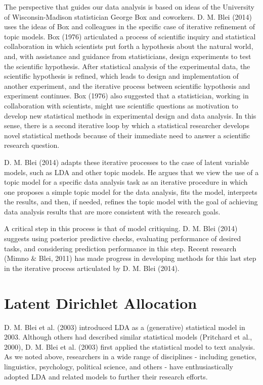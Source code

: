 \documentclass[12pt,]{article}
\begin{document}
The perspective that guides our data analysis is based on ideas of the
University of Wisconsin-Madison statistician George Box and coworkers.
D. M. Blei (2014) uses the ideas of Box and colleagues in the specific
case of iterative refinement of topic models. Box (1976) articulated a
process of scientific inquiry and statistical collaboration in which
scientists put forth a hypothesis about the natural world, and, with
assistance and guidance from statisticians, design experiments to test
the scientific hypothesis. After statistical analysis of the
experimental data, the scientific hypothesis is refined, which leads to
design and implementation of another experiment, and the iterative
process between scientific hypothesis and experiment continues. Box
(1976) also suggested that a statistician, working in collaboration with
scientists, might use scientific questions as motivation to develop new
statistical methods in experimental design and data analysis. In this
sense, there is a second iterative loop by which a statistical
researcher develops novel statistical methods because of their immediate
need to answer a scientific research question.

D. M. Blei (2014) adapts these iterative processes to the case of latent
variable models, such as LDA and other topic models. He argues that we
view the use of a topic model for a specific data analysis task as an
iterative procedure in which one proposes a simple topic model for the
data analysis, fits the model, interprets the results, and then, if
needed, refines the topic model with the goal of achieving data analysis
results that are more consistent with the research goals.

A critical step in this process is that of model critiquing. D. M. Blei
(2014) suggests using posterior predictive checks, evaluating
performance of desired tasks, and considering prediction performance in
this step. Recent research (Mimno \& Blei, 2011) has made progress in
developing methods for this last step in the iterative process
articulated by D. M. Blei (2014).

\section{Latent Dirichlet Allocation}\label{latent-dirichlet-allocation}

D. M. Blei et al. (2003) introduced LDA as a (generative) statistical
model in 2003. Although others had described similar statistical models
(Pritchard et al., 2000), D. M. Blei et al. (2003) first applied the
statistical model to text analysis. As we noted above, researchers in a
wide range of disciplines - including genetics, linguistics, psychology,
political science, and others - have enthusiastically adopted LDA and
related models to further their research efforts.
\end{document}
